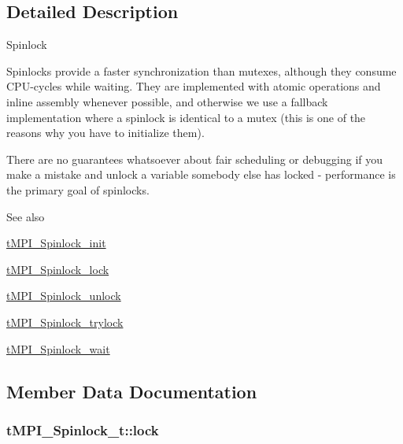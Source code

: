 \subsection{\-Detailed \-Description}
\-Spinlock

\-Spinlocks provide a faster synchronization than mutexes, although they consume \-C\-P\-U-\/cycles while waiting. \-They are implemented with atomic operations and inline assembly whenever possible, and otherwise we use a fallback implementation where a spinlock is identical to a mutex (this is one of the reasons why you have to initialize them).

\-There are no guarantees whatsoever about fair scheduling or debugging if you make a mistake and unlock a variable somebody else has locked -\/ performance is the primary goal of spinlocks.

\begin{DoxySeeAlso}{\-See also}

\begin{DoxyItemize}
\item \hyperlink{share_2template_2gromacs_2thread__mpi_2atomic_2xlc__ppc_8h_a43bcfcb921d49a8a459787430b948727}{t\-M\-P\-I\-\_\-\-Spinlock\-\_\-init}
\item \hyperlink{share_2template_2gromacs_2thread__mpi_2atomic_2xlc__ppc_8h_ae1329dd787dd2280bef3e4f931acd78d}{t\-M\-P\-I\-\_\-\-Spinlock\-\_\-lock}
\item \hyperlink{share_2template_2gromacs_2thread__mpi_2atomic_2xlc__ppc_8h_a0058b8c076a24c3a769a4e452a83b62b}{t\-M\-P\-I\-\_\-\-Spinlock\-\_\-unlock}
\item \hyperlink{share_2template_2gromacs_2thread__mpi_2atomic_2xlc__ppc_8h_a1181c0c3e26cb0ce21564d48c44c5f8b}{t\-M\-P\-I\-\_\-\-Spinlock\-\_\-trylock}
\item \hyperlink{share_2template_2gromacs_2thread__mpi_2atomic_8h_abe9d8b9affd3d12fae787f6a8ce11a15}{t\-M\-P\-I\-\_\-\-Spinlock\-\_\-wait} 
\end{DoxyItemize}
\end{DoxySeeAlso}


\subsection{\-Member \-Data \-Documentation}
\hypertarget{structtMPI__Spinlock__t_aab4bfe38103faeceb8aecb300d53629e}{
\subsubsection[{lock}]{ {\bf t\-M\-P\-I\-\_\-\-Spinlock\-\_\-t\-::lock}}}\label{structtMPI__Spinlock__t_aab4bfe38103faeceb8aecb300d53629e}


